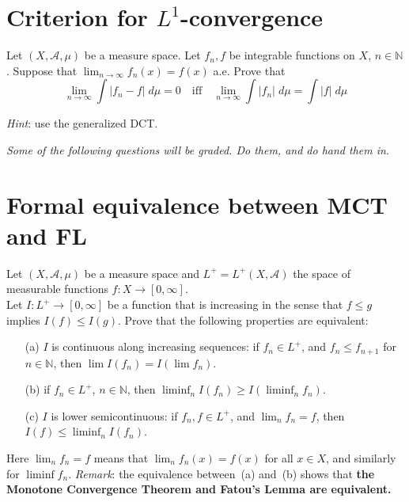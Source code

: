 \documentclass[lang=cn,11pt]{elegantbook}
\begin{document}
\section{Criterion for $L^1$-convergence}
  Let $(X, \mathcal{A}, \mu)$ be a measure space. 
  Let $f_n, f$ be integrable functions on $X$, $n\in \mathbb{N}$. 
  Suppose that $\lim_{n\to\infty} f_n(x)=f(x)$ a.e. Prove that 
  \[
    \lim_{n\to\infty} \int |f_n-f| \; d\mu =0\quad\text{iff}
    \quad \lim_{n\to \infty} \int |f_n| \; d\mu = \int |f|\; d\mu\]

  \textit{Hint}: use the generalized DCT.






  
\vspace*{10mm}
\newpage
\begin{center}
\textit{Some of the following questions will be graded. Do them, and do hand them in}.
\end{center}

\section{Formal equivalence between MCT and FL}
  Let $(X,\mathcal{A},\mu)$ be a measure space and $L^+=L^+(X,\mathcal{A})$ the space of measurable functions $f\colon X\to[0,\infty]$. \\
  Let $I\colon L^+\to[0,\infty]$ be a function that is increasing in the sense that $f\le g$ implies $I(f)\le I(g)$. Prove that the following properties are equivalent:
  \begin{itemize}
  \item[(a)]$I$ is continuous along increasing sequences: if $f_n\in L^+$, and $f_n\le f_{n+1}$ for $n\in\mathbb{N}$, then $\lim I(f_n)=I(\lim f_n)$.
  \item[(b)] if $f_n\in L^+$, $n\in\mathbb{N}$, then $\liminf_nI(f_n)\ge I(\liminf_nf_n)$.
  \item[(c)] $I$ is lower semicontinuous: if $f_n,f\in L^+$, and $\lim_nf_n=f$, then 
    $I(f)\le\liminf_nI(f_n)$.
  \end{itemize}
  Here $\lim_nf_n=f$ means that $\lim_nf_n(x)=f(x)$ for all $x\in X$, and similarly for $\liminf f_n$.
\textit{Remark}: the equivalence between~(a) and~(b) shows that \textbf{the Monotone Convergence Theorem and Fatou's Lemma are equivalent.}
\end{document}
